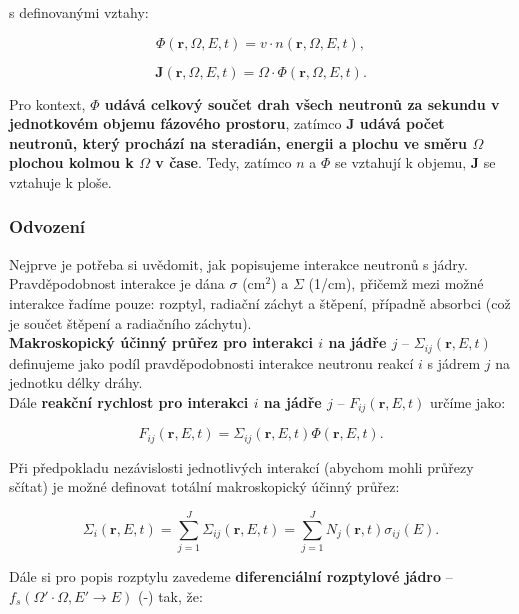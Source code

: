 s definovanými vztahy:

\begin{equation}
  \boxed{
  \Phi(\textbf{r}, \Omega, E, t) = v \cdot n(\textbf{r}, \Omega, E, t),
  \label{definice_hustota_toku}}
\end{equation}

\begin{equation}
  \boxed{
  \textbf{J}(\textbf{r}, \Omega, E, t) = \Omega \cdot \Phi(\textbf{r}, \Omega, E, t).
  \label{definice_hustota_proudu}}
\end{equation}

Pro kontext, \textbf{$\Phi$ udává celkový součet drah všech neutronů za sekundu v jednotkovém objemu fázového prostoru}, zatímco \textbf{$\textbf{J}$ udává počet neutronů, který prochází na steradián, energii a plochu ve směru $\Omega$ plochou kolmou k $\Omega$ v čase}. Tedy, zatímco $n$ a $\Phi$ se vztahují k objemu, $\textbf{J}$ se vztahuje k ploše.

\subsubsection{Odvození}

Nejprve je potřeba si uvědomit, jak popisujeme interakce neutronů s jádry. Pravděpodobnost interakce je dána $\sigma$ (cm$^2$) a $\Sigma$ (1/cm), přičemž mezi možné interakce řadíme pouze: rozptyl, radiační záchyt a štěpení, případně absorbci (což je součet štěpení a radiačního záchytu).\\

\textbf{Makroskopický účinný průřez pro interakci $i$ na jádře $j$} -- $\Sigma_{ij}(\textbf{r}, E, t)$ definujeme jako podíl pravděpodobnosti interakce neutronu reakcí $i$ s jádrem $j$ na jednotku délky dráhy.\\

Dále \textbf{reakční rychlost pro interakci $i$ na jádře $j$} -- $F_{ij}(\textbf{r}, E, t)$ určíme jako:

$$ F_{ij}(\textbf{r}, E, t) = \Sigma_{ij}(\textbf{r}, E, t) \Phi(\textbf{r}, E, t). $$

Při předpokladu nezávislosti jednotlivých interakcí (abychom mohli průřezy sčítat) je možné definovat totální makroskopický účinný průřez:

$$ \Sigma_i(\textbf{r}, E, t) = \sum_{j=1}^J \Sigma_{ij}(\textbf{r}, E, t) = \sum_{j=1}^J N_j(\textbf{r}, t) \sigma_{ij}(E). $$

Dále si pro popis rozptylu zavedeme \textbf{diferenciální rozptylové jádro} -- $f_s(\Omega' \cdot \Omega, E' \rightarrow E)$ (-) tak, že:

